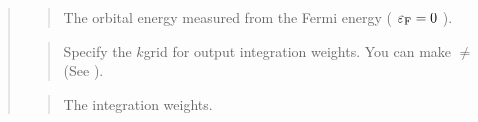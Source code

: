 \documentclass[letterpaper,10pt,pdftex,openany,english]{sphinxmanual}
\begin{document}
\begin{quote}
\begin{sphinxVerbatim}[commandchars=\\\{\}]
\end{sphinxVerbatim}
\begin{quote}

\sphinxAtStartPar
The orbital energy measured from the Fermi energy
( \(\varepsilon_{\rm F} = 0\) ).
\end{quote}

\begin{sphinxVerbatim}[commandchars=\\\{\}]
\end{sphinxVerbatim}
\begin{quote}

\sphinxAtStartPar
Specify the \(k\)\sphinxhyphen{}grid for output integration weights.
You can make  \(\neq\)  (See {\hyperref[\detokenize{app:app}]{}}).
\end{quote}

\begin{sphinxVerbatim}[commandchars=\\\{\}]
\end{sphinxVerbatim}
\begin{quote}

\sphinxAtStartPar
The integration weights.
\end{quote}

\begin{sphinxVerbatim}[commandchars=\\\{\}]
\end{sphinxVerbatim}
\begin{quote}


\end{quote}
\end{quote}
\end{document}
